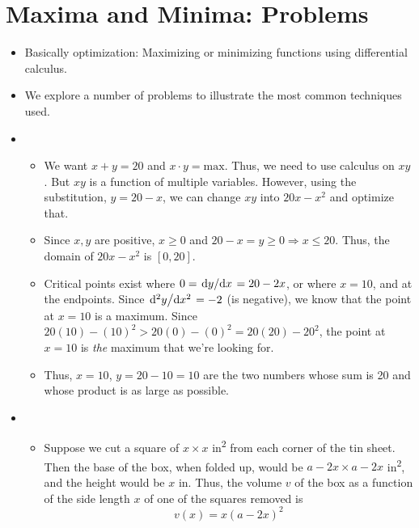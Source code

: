 \documentclass[../main.tex]{subfiles}
\begin{document}
\section{Maxima and Minima: Problems}
\begin{itemize}
    \item {}Basically optimization: Maximizing or minimizing functions using differential calculus.
    \item We explore a number of problems to illustrate the most common techniques used.
    \item {}
    \begin{itemize}
        \item We want $x+y=20$ and $x\cdot y=\text{max}$. Thus, we need to use calculus on $xy$. But $xy$ is a function of multiple variables. However, using the substitution, $y=20-x$, we can change $xy$ into $20x-x^2$ and optimize that.
        \item Since $x,y$ are positive, $x\geq 0$ and $20-x=y\geq 0 \Rightarrow x\leq 20$. Thus, the domain of $20x-x^2$ is $[0,20]$.
        \item Critical points exist where $0=\dv*{y}{x}=20-2x$, or where $x=10$, and at the endpoints. Since $\dv*[2]{y}{x}=-2$ (is negative), we know that the point at $x=10$ is a maximum. Since $20(10)-(10)^2>20(0)-(0)^2=20(20)-20^2$, the point at $x=10$ is \emph{the} maximum that we're looking for.
        \item Thus, $x=10$, $y=20-10=10$ are the two numbers whose sum is 20 and whose product is as large as possible.
    \end{itemize}
    \item {}
    \begin{itemize}
        \item Suppose we cut a square of $x\times x$ in\textsuperscript{2} from each corner of the tin sheet. Then the base of the box, when folded up, would be $a-2x\times a-2x$ in\textsuperscript{2}, and the height would be $x$ in. Thus, the volume $v$ of the box as a function of the side length $x$ of one of the squares removed is
        \begin{equation*}
            v(x) = x(a-2x)^2

\end{equation*}
\end{itemize}
\end{itemize}
\end{document}
